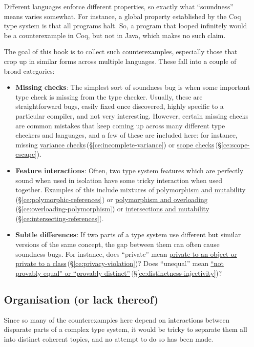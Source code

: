 \documentclass[11pt,oneside]{article}
\newenvironment{ceitemize}{\begin{itemize}}{\end{itemize}}
\newcommand{\entryref}[2]{\hyperref[#1]{#2}\,\textcolor{stone}{(\S\ref*{#1})}}
\begin{document}
Different languages enforce different properties, so exactly what ``soundness'' means varies somewhat. For instance, a global property established by the Coq type system is that all programs halt. So, a program that looped infinitely would be a counterexample in Coq, but not in Java, which makes no such claim.

The goal of this book is to collect such counterexamples, especially those that crop up in similar forms across multiple languages. These fall into a couple of broad categories:

\begin{ceitemize}
\item \textbf{Missing checks}: The simplest sort of soundness bug is when some important type check is missing from the type checker. Usually, these are straightforward bugs, easily fixed once discovered, highly specific to a particular compiler, and not very interesting. However, certain missing checks are common mistakes that keep coming up across many different type checkers and languages, and a few of these are included here: for instance, missing \entryref{ce:incomplete-variance}{variance checks} or \entryref{ce:scope-escape}{scope checks}.
\item \textbf{Feature interactions}: Often, two type system features which are perfectly sound when used in isolation have some tricky interaction when used together. Examples of this include mixtures of \entryref{ce:polymorphic-references}{polymorphism and mutability} or \entryref{ce:overloading-polymorphism}{polymorphism and overloading} or \entryref{ce:intersecting-references}{intersections and mutability}.
\item \textbf{Subtle differences}: If two parts of a type system use different but similar versions of the same concept, the gap between them can often cause soundness bugs. For instance, does ``private'' mean \entryref{ce:privacy-violation}{private to an object or private to a class}? Does ``unequal'' mean \entryref{ce:distinctness-injectivity}{``not provably equal'' or ``provably distinct''}?
\end{ceitemize}

\subsection*{Organisation (or lack thereof)}
Since so many of the counterexamples here depend on interactions between disparate parts of a complex type system, it would be tricky to separate them all into distinct coherent topics, and no attempt to do so has been made.
\end{document}
